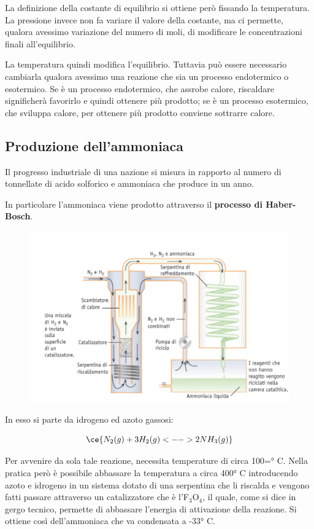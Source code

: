 \vspace{0.2cm}La definizione della costante di equilibrio si ottiene però fissando la temperatura. La pressione invece non fa variare il valore della costante, ma ci permette, qualora avessimo variazione del numero di moli, di modificare le concentrazioni finali all'equilibrio.

La temperatura quindi modifica l'equilibrio. Tuttavia può essere necessario cambiarla qualora avessimo una reazione che sia un processo endotermico o esotermico. Se è un processo endotermico, che assrobe calore, riscaldare significherà favorirlo e quindi ottenere più prodotto; se è un processo esotermico, che sviluppa calore, per ottenere più prodotto conviene sottrarre calore.
\subsection{Produzione dell'ammoniaca}
Il progresso industriale di una nazione si misura in rapporto al numero di tonnellate di acido solforico e ammoniaca che produce in un anno.

In particolare l'ammoniaca viene prodotto attraverso il \textbf{processo di Haber-Bosch}.

\vspace{-1cm}\begin{figure}[htp]
    \centering
    \includegraphics[width=14cm]{immagini/produzione_ammoniaca.png}
\end{figure}

In esso si parte da idrogeno ed azoto gassosi:

$$\ce{N_2(g) + 3H_2(g) <--> 2NH_3(g)}$$

Per avvenire da sola tale reazione, necessita temperature di circa 100=° C. Nella pratica però è possibile abbassare la temperatura a circa 400° C introducendo azoto e idrogeno in un sistema dotato di una serpentina che li riscalda e vengono fatti passare attraverso un catalizzatore che è l'F$_3$O$_4$, il quale, come si dice in gergo tecnico, permette di abbassare l'energia di attivazione della reazione. Si ottiene così dell'ammoniaca che va condensata a -33° C.

